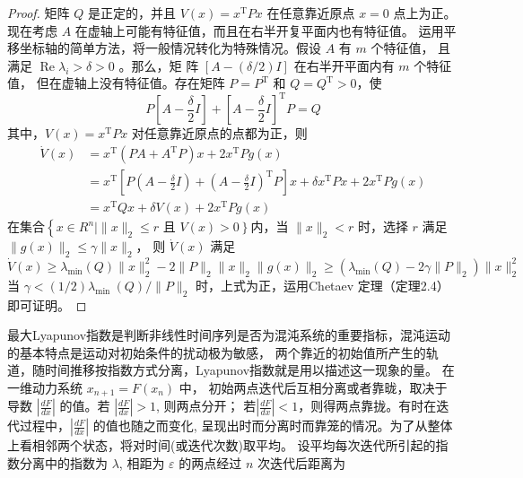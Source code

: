 \begin{proof}
    矩阵 $Q$ 是正定的，并且 $V(x)=x^{\mathrm{T}} P x$ 在任意靠近原点 $x=0$ 点上为正。
    现在考虑 $A$ 在虚轴上可能有特征值，而且在右半开复平面内也有特征值。
    运用平移坐标轴的简单方法，将一般情况转化为特殊情况。假设 $A$ 有 $m$ 个特征值，
    且满足 $\operatorname{Re} \lambda_i>\delta>0$ 。那么，矩 阵 $[A-(\delta / 2) I]$ 在右半开平面内有 $m$ 个特征值，
    但在虚轴上没有特征值。存在矩阵 $P=P^{\mathrm{T}}$ 和 $Q=Q^{\mathrm{T}}>0$，使
    \begin{equation}
        P\left[A-\frac{\delta}{2} I\right]+\left[A-\frac{\delta}{2} I\right]^{\mathrm{T}} P=Q
    \end{equation}
    其中，$V(x)=x^{\mathrm{T}} P x$ 对任意靠近原点的点都为正，则
    \begin{equation}
        \begin{aligned}
        \dot{V}(x) & =x^{\mathrm{T}}\left(P A+A^{\mathrm{T}} P\right) x+2 x^{\mathrm{T}} P g(x) \\
        & =x^{\mathrm{T}}\left[P\left(A-\frac{\delta}{2} I\right)+\left(A-\frac{\delta}{2} I\right)^{\mathrm{T}} P\right] x+\delta x^{\mathrm{T}} P x+2 x^{\mathrm{T}} P g(x) \\
        & =x^{\mathrm{T}} Q x+\delta V(x)+2 x^{\mathrm{T}} P g(x)
        \end{aligned}
    \end{equation}
    在集合$\left\{x \in R^n \mid\|x\|_2 \leqslant r\right.$ 且 $\left.V(x)>0\right\}$内，当 $\|x\|_2<r$ 时，选择 $r$ 满足 $\|g(x)\|_2 \leqslant \gamma\|x\|_2$，
    则 $\dot{V}(x)$ 满足
    \begin{equation}
        \dot{V}(x) \geqslant \lambda_{\min }(Q)\|x\|_2^2-2\|P\|_2\|x\|_2\|g(x)\|_2 \geqslant\left(\lambda_{\min }(Q)-2 \gamma\|P\|_2\right)\|x\|_2^2
    \end{equation}
    当 $\gamma<(1 / 2) \lambda_{\text {min }}(Q) /\|P\|_2$ 时，上式为正，运用Chetaev 定理（定理2.4）即可证明。
\end{proof}
最大Lyapunov指数是判断非线性时间序列是否为混沌系统的重要指标，混沌运动的基本特点是运动对初始条件的扰动极为敏感，
两个靠近的初始值所产生的轨道，随时间推移按指数方式分离，Lyapunov指数就是用以描述这一现象的量。
在一维动力系统 $x_{n+1}=F\left(x_{n}\right)$ 中， 初始两点迭代后互相分离或者靠昽，取决于导数
$\left|\frac{d F}{d x}\right|$ 的值。若 $\left|\frac{d F}{d x}\right|>1$, 则两点分开；
若$\left|\frac{d F}{d x}\right|<1$，则得两点靠拢。有时在迭代过程中，$\left|\frac{d F}{d x}\right|$ 
的值也随之而变化, 呈现出时而分离时而靠笼的情况。为了从整体上看相邻两个状态，将对时间(或迭代次数)取平均。
设平均每次迭代所引起的指数分离中的指数为 $\lambda$, 相距为 $\varepsilon$ 的两点经过 $n$ 次迭代后距离为
